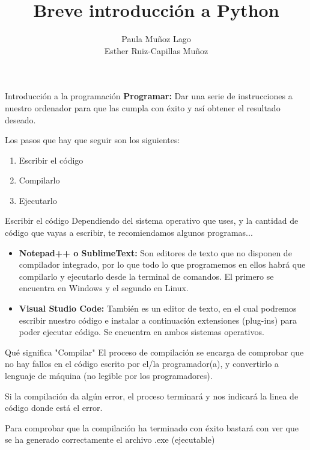 \documentclass{beamer}
\title{Breve introducción a Python}
\author{Paula Muñoz Lago \\ Esther Ruiz-Capillas Muñoz}
\institute{Facultad de Informática, UCM}
\begin{document}
    \begin{frame}
        \maketitle
    \end{frame}

    \begin{frame} {Introducción a la programación}
	    \textbf{Programar: } Dar una serie de instrucciones a nuestro ordenador para que las cumpla con éxito y así obtener el resultado deseado.
	    
	    Los pasos que hay que seguir son los siguientes: 
	    \begin{enumerate}
	    	\item Escribir el código
	    	\item Compilarlo
	    	\item Ejecutarlo
	    \end{enumerate}
	\end{frame}

	\begin{frame} {Escribir el código}
		Dependiendo del sistema operativo que uses, y la cantidad de código que vayas a escribir, te recomiendamos algunos programas...
		
		\begin{itemize}
			\item \textbf{Notepad++ o SublimeText:} Son editores de texto que no disponen de compilador integrado, por lo que todo lo que programemos en ellos habrá que compilarlo y ejecutarlo desde la terminal de comandos. El primero se encuentra en Windows y el segundo en Linux.
			\item \textbf{Visual Studio Code: } También es un editor de texto, en el cual podremos escribir nuestro código e instalar a continuación extensiones (plug-ins) para poder ejecutar código. Se encuentra en ambos sistemas operativos.
		\end{itemize}
	\end{frame}

	\begin{frame}{Qué significa "Compilar"}
	\setlength{\parskip}{8mm}
	El proceso de compilación se encarga de comprobar que no hay fallos en el código escrito por el/la programador(a), y convertirlo a lenguaje de máquina (no legible por los programadores).
	
	Si la compilación da algún error, el proceso terminará y nos indicará la linea de código donde está el error.
	
	Para comprobar que la compilación ha terminado con éxito bastará con ver que se ha generado correctamente el archivo .exe (ejecutable)
	\end{frame}
\end{document}
